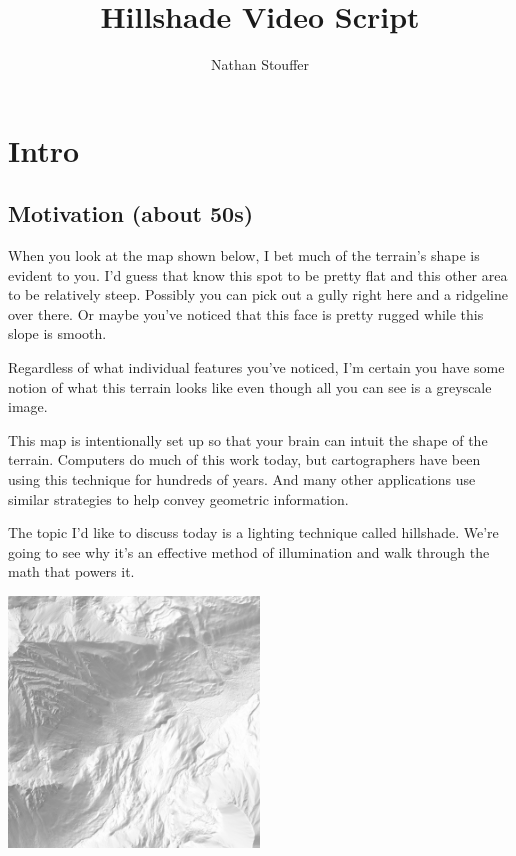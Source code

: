 \documentclass{article}
\begin{document}
	
\title{Hillshade Video Script}
\author{Nathan Stouffer}
\date{}
\maketitle

\section{Intro}

\subsection{Motivation (about 50s)}

When you look at the map shown below, I bet much of the terrain's shape is evident to you.
I'd guess that know this spot to be pretty flat and this other area to be relatively steep.
Possibly you can pick out a gully right here and a ridgeline over there.
Or maybe you've noticed that this face is pretty rugged while this slope is smooth.

Regardless of what individual features you've noticed, I'm certain you have some notion of what this terrain looks like even though all you can see is a greyscale image.

This map is intentionally set up so that your brain can intuit the shape of the terrain.
Computers do much of this work today, but cartographers have been using this technique for hundreds of years.
And many other applications use similar strategies to help convey geometric information.

The topic I'd like to discuss today is a lighting technique called hillshade.
We're going to see why it's an effective method of illumination and walk through the math that powers it.

\begin{center}
	\includegraphics[width=0.5\textwidth,frame]{assets/hillshade-example.png}
\end{center}
\end{document}

